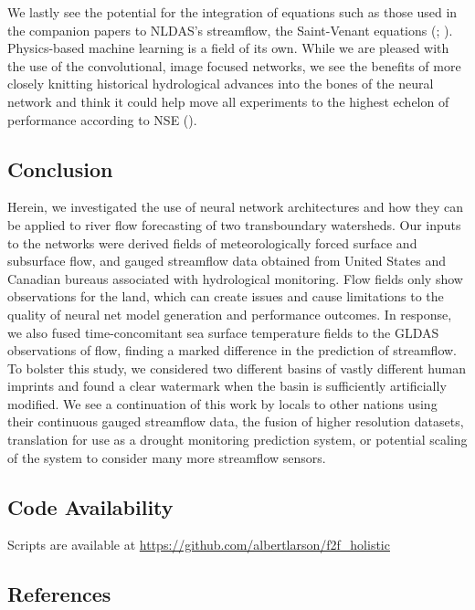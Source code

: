 \begin{refsection}
We lastly see the potential for the integration of equations such as those used in the companion papers to NLDAS’s streamflow, the Saint-Venant equations (\cite{xia2012continental}; \cite{strelkoff1970numerical}). Physics-based machine learning is a field of its own. While we are pleased with the use of the convolutional, image focused networks, we see the benefits of more closely knitting historical hydrological advances into the bones of the neural network and think it could help move all experiments to the highest echelon of performance according to NSE (\cite{moseley2021finite}).  


\subsection{Conclusion}
Herein, we investigated the use of neural network architectures and how they can be applied to river flow forecasting of two transboundary watersheds. Our inputs to the networks were derived fields of meteorologically forced surface and subsurface flow, and gauged streamflow data obtained from United States and Canadian bureaus associated with hydrological monitoring. Flow fields only show observations for the land, which can create issues and cause limitations to the quality of neural net model generation and performance outcomes. In response, we also fused time-concomitant sea surface temperature fields to the GLDAS observations of flow, finding a marked difference in the prediction of streamflow. To bolster this study, we considered two different basins of vastly different human imprints and found a clear watermark when the basin is sufficiently artificially modified. We see a continuation of this work by locals to other nations using their continuous gauged streamflow data, the fusion of higher resolution datasets, translation for use as a drought monitoring prediction system, or potential scaling of the system to consider many more streamflow sensors.

\newpage
\subsection{Code Availability}
Scripts are available at \url{https://github.com/albertlarson/f2f_holistic}


\subsection{References}
\printbibliography[heading=none]
\end{refsection}

